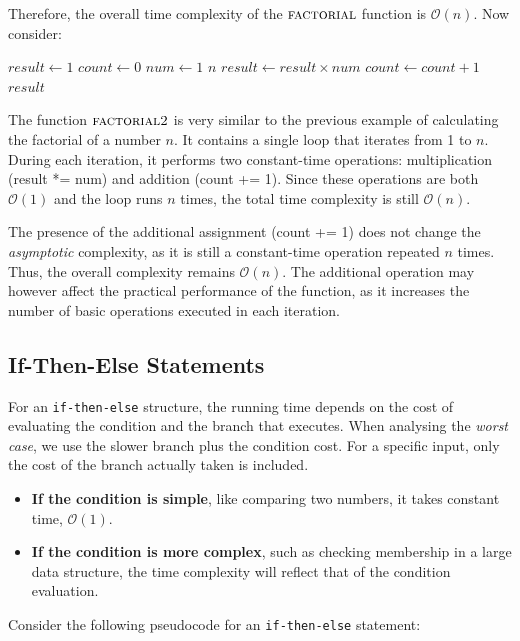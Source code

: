 Therefore, the overall time complexity of the $\proc{factorial}$ function is $\mathcal{O}(n)$. Now consider:

\begin{codebox}
    \li $result \gets 1$
    \li $count \gets 0$
    \li \For $num \gets 1$ \To $n$ \Do
    \li     $result \gets result \times num$
    \li     $count \gets count + 1$
        \End
    \li \Return $result$
\end{codebox}

The function $\proc{factorial2}$ is very similar to the previous example of calculating the factorial of a number \( n \). It contains a single loop that iterates from 1 to \( n \). During each iteration, it performs two constant-time operations: multiplication (result *= num) and addition (count += 1). Since these operations are both \(\mathcal{O}(1)\) and the loop runs \( n \) times, the total time complexity is still \(\mathcal{O}(n)\).

The presence of the additional assignment (count += 1) does not change the \textit{asymptotic} complexity, as it is still a constant-time operation repeated \( n \) times. Thus, the overall complexity remains \(\mathcal{O}(n)\). The additional  operation may however affect the practical performance of the function, as it increases the number of basic operations executed in each iteration.

\subsection*{If-Then-Else Statements}
For an \texttt{if-then-else} structure, the running time depends on the cost of evaluating the condition and the branch that executes. When analysing the \emph{worst case}, we use the slower branch plus the condition cost. For a specific input, only the cost of the branch actually taken is included.

\begin{itemize}
    \item \textbf{If the condition is simple}, like comparing two numbers, it takes constant time, $\mathcal{O}(1)$.
    \item \textbf{If the condition is more complex}, such as checking membership in a large data structure, the time complexity will reflect that of the condition evaluation.
\end{itemize}

Consider the following pseudocode for an \texttt{if-then-else} statement:

